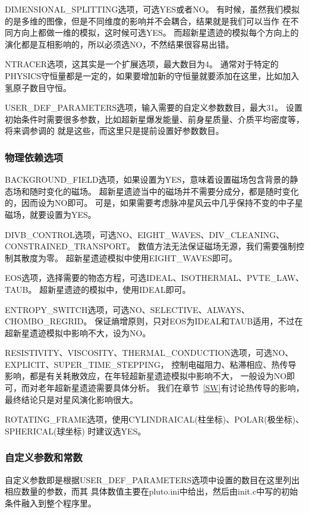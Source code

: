 DIMENSIONAL\_SPLITTING选项，可选YES或者NO。
有时候，虽然我们模拟的是多维的图像，但是不同维度的影响并不会耦合，结果就是我们可以当作
在不同方向上都做一维的模拟，这时候可选YES。
而超新星遗迹的模拟每个方向上的演化都是互相影响的，所以必须选NO，不然结果很容易出错。

NTRACER选项，这其实是一个扩展选项，最大数目为4。
通常对于特定的PHYSICS守恒量都是一定的，如果要增加新的守恒量就要添加在这里，比如加入
氢原子数目守恒。

USER\_DEF\_PARAMETERS选项，输入需要的自定义参数数目，最大31。
设置初始条件时需要很多参数，比如超新星爆发能量、前身星质量、介质平均密度等，将来调参调的
就是这些，而这里只是提前设置好参数数目。

\subsubsection{物理依赖选项}
BACKGROUND\_FIELD选项，如果设置为YES，意味着设置磁场包含背景的静态场和随时变化的磁场。
超新星遗迹当中的磁场并不需要分成分，都是随时变化的，因而设为NO即可。
可是，如果需要考虑脉冲星风云中几乎保持不变的中子星磁场，就要设置为YES。

DIVB\_CONTROL选项，可选NO、EIGHT\_WAVES、DIV\_CLEANING、CONSTRAINED\_TRANSPORT。
数值方法无法保证磁场无源，我们需要强制控制其散度为零。
超新星遗迹模拟中使用EIGHT\_WAVES即可。

EOS选项，选择需要的物态方程，可选IDEAL、ISOTHERMAL、PVTE\_LAW、TAUB。
超新星遗迹的模拟中，使用IDEAL即可。

ENTROPY\_SWITCH选项，可选NO、SELECTIVE、ALWAYS、CHOMBO\_REGRID。
保证熵增原则，只对EOS为IDEAL和TAUB适用，不过在超新星遗迹模拟中影响不大，设为NO。

RESISTIVITY、VISCOSITY、THERMAL\_CONDUCTION选项，可选NO、EXPLICIT、SUPER\_TIME\_STEPPING，
控制电磁阻力、粘滞相应、热传导影响，都是有关耗散效应，在年轻超新星遗迹模拟中影响不大，
一般设为NO即可，而对老年超新星遗迹需要具体分析。
我们在章节~\ref{SW}有讨论热传导的影响，最终结论只是对星风演化影响很大。

ROTATING\_FRAME选项，使用CYLINDRAICAL(柱坐标)、POLAR(极坐标)、SPHERICAL(球坐标)
时建议选YES。

\subsubsection{自定义参数和常数}
自定义参数即是根据USER\_DEF\_PARAMETERS选项中设置的数目在这里列出相应数量的参数，而其
具体数值主要在pluto.ini中给出，然后由init.c中写的初始条件融入到整个程序里。

